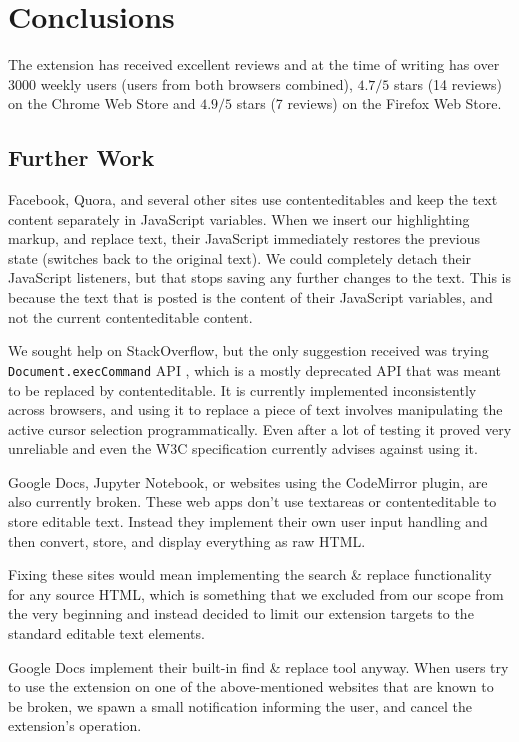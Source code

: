 \documentclass[bsc,frontabs,twoside,singlespacing,parskip,deptreport]{infthesis}
\begin{document}
\chapter{Conclusions}
The extension has received excellent reviews and at the time of writing has over 3000 weekly users (users from both browsers combined), $4.7/5$ stars (14 reviews) on the Chrome Web Store and $4.9/5$ stars (7 reviews) on the Firefox Web Store.

\section{Further Work}
Facebook, Quora, and several other sites use contenteditables and keep the text content separately in JavaScript variables. When we insert our highlighting markup, and replace text, their JavaScript immediately restores the previous state (switches back to the original text). We could completely detach their JavaScript listeners, but that stops saving any further changes to the text. This is because the text that is posted is the content of their JavaScript variables, and not the current contenteditable content.

We sought help on StackOverflow, but the only suggestion received was trying \texttt{Document.execCommand} API \cite{A10}, which is a mostly deprecated API that was meant to be replaced by contenteditable. It is currently implemented inconsistently across browsers, and using it to replace a piece of text involves manipulating the active cursor selection programmatically. Even after a lot of testing it proved very unreliable and even the W3C specification currently advises against using it.

Google Docs, Jupyter Notebook, or websites using the CodeMirror plugin, are also currently broken. These web apps don't use textareas or contenteditable to store editable text. Instead they implement their own user input handling and then convert, store, and display everything as raw HTML.

Fixing these sites would mean implementing the search \& replace functionality for any source HTML, which is something that we excluded from our scope from the very beginning and instead decided to limit our extension targets to the standard editable text elements.

Google Docs implement their built-in find \& replace tool anyway. When users try to use the extension on one of the above-mentioned websites that are known to be broken, we spawn a small notification informing the user, and cancel the extension's operation.
\end{document}
